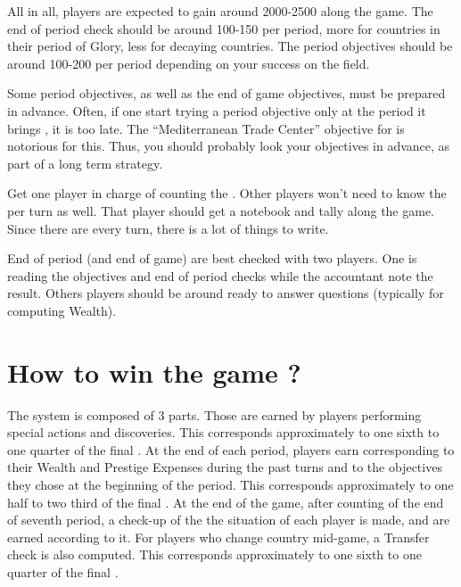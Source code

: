 \begin{designnote}
  All in all, players are expected to gain around 2000-2500 \VPs along the
  game. The end of period check should be around 100-150 \VPs per period, more
  for countries in their period of Glory, less for decaying countries. The
  period objectives should be around 100-200 \VPs per period depending on your
  success on the field.
\end{designnote}

\begin{playtip}
  Some period objectives, as well as the end of game objectives, must be
  prepared in advance. Often, if one start trying a period objective
  only at the period it brings \VPs, it is too late. The ``Mediterranean
  Trade Center'' objective for \FRA is notorious for this. Thus, you
  should probably look your objectives in advance, as part of a long
  term strategy.
\end{playtip}

\begin{playtip}
  Get one player in charge of counting the \VPs. Other players won't need to
  know the \VPs per turn as well. That player should get a notebook and tally
  \VPs along the game. Since there are \VPs every turn, there is a lot of
  things to write.

  End of period (and end of game) \VPs are best checked with two players. One
  is reading the objectives and end of period checks while the \VPs accountant
  note the result. Others players should be around ready to answer questions
  (typically for computing Wealth).
\end{playtip}

\section{How to win the game ?}

\aparag The \VP system is composed of 3 parts.
Those \VPs are earned by players performing special actions and
discoveries. This corresponds approximately to one sixth to one quarter of the
final \VPs.
At the end of each period, players earn \VPs corresponding to their Wealth and
Prestige Expenses during the past turns and to the objectives they chose at
the beginning of the period. This corresponds approximately to one half to two
third of the final \VPs.
At the end of the game, after counting \VPs of the end of seventh period, a
check-up of the the situation of each player is made, and \VPs are earned
according to it. For players who change country mid-game, a Transfer check is
also computed. This corresponds approximately to one sixth to one quarter of
the final \VPs.




